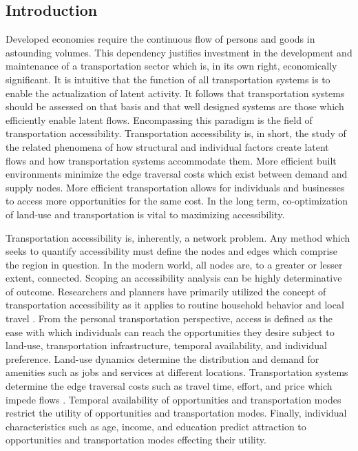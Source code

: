\documentclass[11pt]{article}
\begin{document}
\begin{multicols}{2}

\section*{Introduction}

Developed economies require the continuous flow of persons and goods in astounding volumes. This dependency justifies investment in the development and maintenance of a transportation sector which is, in its own right, economically significant. It is intuitive that the function of all transportation systems is to enable the actualization of latent activity. It follows that transportation systems should be assessed on that basis and that well designed systems are those which efficiently enable latent flows. Encompassing this paradigm is the field of transportation accessibility. Transportation accessibility is, in short, the study of the related phenomena of how structural and individual factors create latent flows and how transportation systems accommodate them. More efficient built environments minimize the edge traversal costs which exist between demand and supply nodes. More efficient transportation allows for individuals and businesses to access more opportunities for the same cost. In the long term, co-optimization of land-use and transportation is vital to maximizing accessibility.

Transportation accessibility is, inherently, a network problem. Any method which seeks to quantify accessibility must define the nodes and edges which comprise the region in question. In the modern world, all nodes are, to a greater or lesser extent, connected. Scoping an accessibility analysis can be highly determinative of outcome. Researchers and planners have primarily utilized the concept of transportation accessibility as it applies to routine household behavior and local travel \cite{Handy_2020}. From the personal transportation perspective, access is defined as the ease with which individuals can reach the opportunities they desire subject to land-use, transportation infrastructure, temporal availability, and individual preference. Land-use dynamics determine the distribution and demand for amenities such as jobs and services at different locations. Transportation systems determine the edge traversal costs such as travel time, effort, and price which impede flows \cite{Geurs_2004}. Temporal availability of opportunities and transportation modes restrict the utility of opportunities and transportation modes. Finally, individual characteristics such as age, income, and education predict attraction to opportunities  and transportation modes \cite{Miller_2018} effecting their utility.


\end{multicols}
\end{document}
